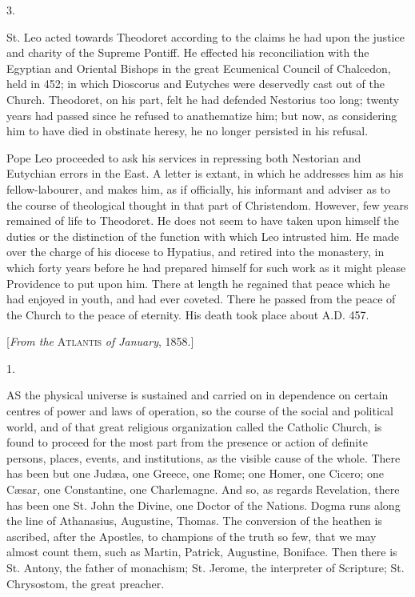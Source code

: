 3.

St. Leo acted towards Theodoret according to the claims he had upon
the justice and charity of the Supreme Pontiff. He effected his
reconciliation with the Egyptian and Oriental Bishops in the great
Ecumenical Council of Chalcedon, held in 452; in which Dioscorus and
Eutyches were deservedly cast out of the Church. Theodoret, on his
part, felt he had defended Nestorius too long; twenty years had passed
since he refused to anathematize him; but now, as considering him to
have died in obstinate heresy, he no longer persisted in his refusal.

Pope Leo proceeded to ask his services in repressing both
Nestorian and Eutychian errors in the East. A letter is extant, in
which he addresses him as his fellow-labourer, and makes him, as if
officially, his informant and adviser as to the course of theological
thought in that part of Christendom. However, few years remained of
life to Theodoret. He does not seem to have taken upon himself the
duties or the distinction of the function with which Leo intrusted
him. He made over the charge of his diocese to Hypatius, and retired
into the monastery, in which forty years before he had prepared
himself for such work as it might please Providence to put upon him.
There at length he regained that peace which he had enjoyed in youth,
and had ever coveted. There he passed from the peace of the Church to
the peace of eternity. His death took place about A.D.
457.


[\emph{From the} A\textsc{tlantis} \emph{of January},
1858.]

1.

AS the physical universe is sustained
and carried on in dependence on certain centres of power and laws of
operation, so the course of the social and political world, and of
that great religious organization called the Catholic Church, is found
to proceed for the most part from the presence or action of definite
persons, places, events, and institutions, as the visible cause of the
whole. There has been but one Judæa, one Greece, one Rome; one Homer,
one Cicero; one Cæsar, one Constantine, one Charlemagne. And so, as
regards Revelation, there has been one St. John the Divine, one Doctor
of the Nations. Dogma runs along the line of Athanasius, Augustine,
Thomas. The conversion of the heathen is ascribed, after the Apostles,
to champions of the truth so few, that we may almost count them, such
as Martin, Patrick, Augustine, Boniface. Then there is St. Antony, the
father of monachism; St. Jerome, the interpreter of Scripture; St.
Chrysostom, the great preacher.

